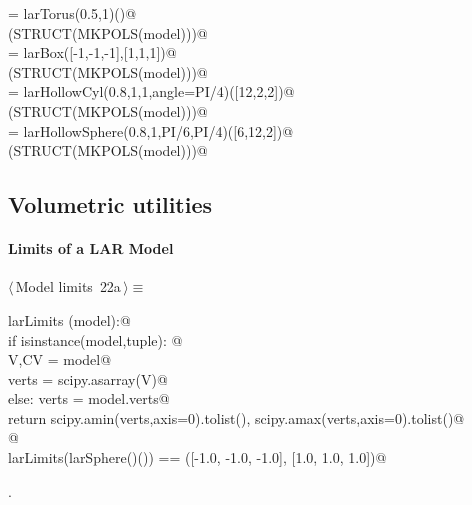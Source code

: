 \documentclass[11pt,oneside]{article}	%
\begin{document}
\begin{flushleft}
\begin{list}{}{}
\mbox{}\verb@model = larTorus(0.5,1)()@\\
\mbox{}\verb@VIEW(STRUCT(MKPOLS(model)))@\\
\mbox{}\verb@model = larBox([-1,-1,-1],[1,1,1])@\\
\mbox{}\verb@VIEW(STRUCT(MKPOLS(model)))@\\
\mbox{}\verb@model = larHollowCyl(0.8,1,1,angle=PI/4)([12,2,2])@\\
\mbox{}\verb@VIEW(STRUCT(MKPOLS(model)))@\\
\mbox{}\verb@model = larHollowSphere(0.8,1,PI/6,PI/4)([6,12,2])@\\
\mbox{}\verb@VIEW(STRUCT(MKPOLS(model)))@\\
\mbox{}\verb@@{\NWsep}
\end{list}
\vspace{-2ex}
\end{flushleft}


\subsection{Volumetric utilities}


\paragraph{Limits of a LAR Model}
\begin{flushleft} \small \label{scrap41}
\protect{}$\langle\,$Model limits\nobreak\ {\footnotesize 22a}$\,\rangle\equiv$
\vspace{-1ex}
\begin{list}{}{} \item
\mbox{}\verb@def larLimits (model):@\\
\mbox{}\verb@   if isinstance(model,tuple): @\\
\mbox{}\verb@      V,CV = model@\\
\mbox{}\verb@      verts = scipy.asarray(V)@\\
\mbox{}\verb@   else: verts = model.verts@\\
\mbox{}\verb@   return scipy.amin(verts,axis=0).tolist(), scipy.amax(verts,axis=0).tolist()@\\
\mbox{}\verb@   @\\
\mbox{}\verb@assert larLimits(larSphere()()) == ([-1.0, -1.0, -1.0], [1.0, 1.0, 1.0])@\\
\mbox{}\verb@@{\NWsep}
\end{list}
\vspace{-1ex}
\footnotesize\addtolength{\baselineskip}{-1ex}
\begin{list}{}{\setlength{\itemsep}{-\parsep}\setlength{\itemindent}{-\leftmargin}}
\item {\NWtxtMacroNoRef}.
\end{list}
\end{flushleft}
\end{document}
